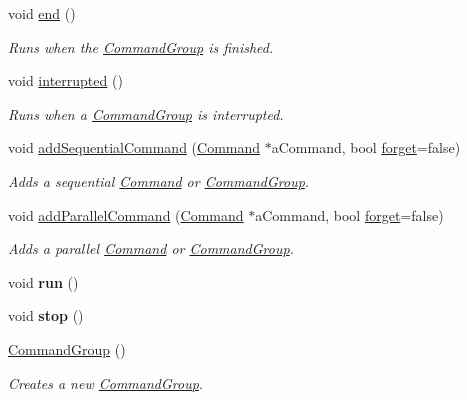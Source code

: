 \begin{DoxyCompactItemize}
void \mbox{\hyperlink{classlib_iterative_robot_1_1_command_group_a28ad3a1c2f6b4f9aea10efa1a824895e}{end}} ()
\begin{DoxyCompactList}\small\item\em Runs when the \mbox{\hyperlink{classlib_iterative_robot_1_1_command_group}{Command\+Group}} is finished. \end{DoxyCompactList}\item 
void \mbox{\hyperlink{classlib_iterative_robot_1_1_command_group_a5174a8e63675bead12b84e39df0ae90e}{interrupted}} ()
\begin{DoxyCompactList}\small\item\em Runs when a \mbox{\hyperlink{classlib_iterative_robot_1_1_command_group}{Command\+Group}} is interrupted. \end{DoxyCompactList}\item 
void \mbox{\hyperlink{classlib_iterative_robot_1_1_command_group_a7e3167a89a45e6b1fc5df9a18c2946b7}{add\+Sequential\+Command}} (\mbox{\hyperlink{classlib_iterative_robot_1_1_command}{Command}} $\ast$a\+Command, bool \mbox{\hyperlink{classlib_iterative_robot_1_1_command_group_ae6779a068983b84e265c0ff4fc74488d}{forget}}=false)
\begin{DoxyCompactList}\small\item\em Adds a sequential \mbox{\hyperlink{classlib_iterative_robot_1_1_command}{Command}} or \mbox{\hyperlink{classlib_iterative_robot_1_1_command_group}{Command\+Group}}. \end{DoxyCompactList}\item 
void \mbox{\hyperlink{classlib_iterative_robot_1_1_command_group_a7255a0b640e74ce74870939b45d23a58}{add\+Parallel\+Command}} (\mbox{\hyperlink{classlib_iterative_robot_1_1_command}{Command}} $\ast$a\+Command, bool \mbox{\hyperlink{classlib_iterative_robot_1_1_command_group_ae6779a068983b84e265c0ff4fc74488d}{forget}}=false)
\begin{DoxyCompactList}\small\item\em Adds a parallel \mbox{\hyperlink{classlib_iterative_robot_1_1_command}{Command}} or \mbox{\hyperlink{classlib_iterative_robot_1_1_command_group}{Command\+Group}}. \end{DoxyCompactList}\item 
\mbox{\label{classlib_iterative_robot_1_1_command_group_a9e76c6d0ef039eca4dc27dd2f0144485}} 
void {\bfseries run} ()
\item 
\mbox{\label{classlib_iterative_robot_1_1_command_group_ad521849c9a7f1b3f952b318ee424c5b9}} 
void {\bfseries stop} ()
\item 
\mbox{\hyperlink{classlib_iterative_robot_1_1_command_group_a862143e691209986739c234cb0fc4cc8}{Command\+Group}} ()
\begin{DoxyCompactList}\small\item\em Creates a new \mbox{\hyperlink{classlib_iterative_robot_1_1_command_group}{Command\+Group}}. \end{DoxyCompactList}\end{DoxyCompactItemize}

